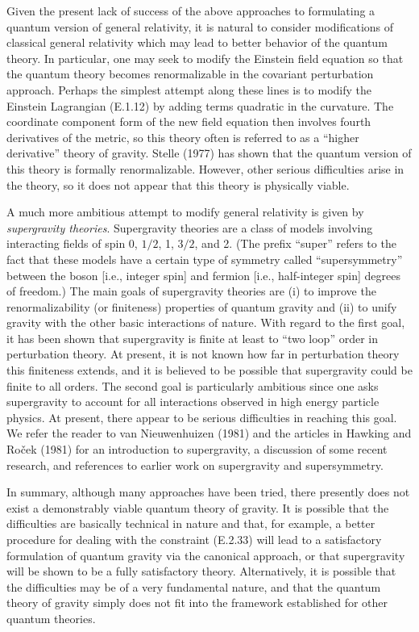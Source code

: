 Given the present lack of success of the above approaches to formulating a
quantum version of general relativity, it is natural to consider modifications of
classical general relativity which may lead to better behavior of the quantum theory.
In particular, one may seek to modify the Einstein field equation so that the quantum
theory becomes renormalizable in the covariant perturbation approach. Perhaps the
simplest attempt along these lines is to modify the Einstein Lagrangian (E.1.12) by
adding terms quadratic in the curvature. The coordinate component form of the new
field equation then involves fourth derivatives of the metric, so this theory often is
referred to as a ``higher derivative'' theory of gravity. Stelle (1977) has shown that
the quantum version of this theory is formally renormalizable. However, other
serious difficulties arise in the theory, so it does not appear that this theory is
physically viable.

A much more ambitious attempt to modify general relativity is given by \emph{supergravity
theories}. Supergravity theories are a class of models involving interacting
fields of spin 0, \(1/2\), 1, \(3/2\), and 2. (The prefix ``super'' refers to the fact that these
models have a certain type of symmetry called ``supersymmetry'' between the boson
[i.e., integer spin] and fermion [i.e., half-integer spin] degrees of freedom.) The
main goals of supergravity theories are (i) to improve the renormalizability (or
finiteness) properties of quantum gravity and (ii) to unify gravity with the other basic
interactions of nature. With regard to the first goal, it has been shown that supergravity
is finite at least to ``two loop'' order in perturbation theory. At present, it is
not known how far in perturbation theory this finiteness extends, and it is believed
to be possible that supergravity could be finite to all orders. The second goal is
particularly ambitious since one asks supergravity to account for all interactions
observed in high energy particle physics. At present, there appear to be serious
difficulties in reaching this goal. We refer the reader to van Nieuwenhuizen (1981)
and the articles in Hawking and Roček (1981) for an introduction to supergravity,
a discussion of some recent research, and references to earlier work on supergravity
and supersymmetry.

In summary, although many approaches have been tried, there presently does not
exist a demonstrably viable quantum theory of gravity. It is possible that the
difficulties are basically technical in nature and that, for example, a better procedure
for dealing with the constraint (E.2.33) will lead to a satisfactory formulation of
quantum gravity via the canonical approach, or that supergravity will be shown to
be a fully satisfactory theory. Alternatively, it is possible that the difficulties may be
of a very fundamental nature, and that the quantum theory of gravity simply does not
fit into the framework established for other quantum theories.


